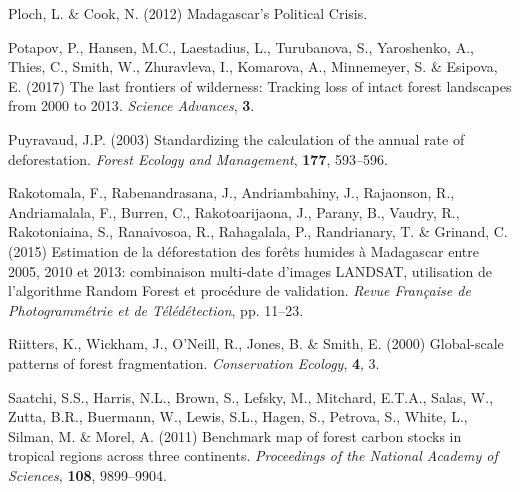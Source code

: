 \documentclass[a4paper, 12pt, leqno]{article} %
\begin{document}
\begin{thebibliography}{55}
Ploch, L. \& Cook, N. (2012) {Madagascar's Political Crisis}.

Potapov, P., Hansen, M.C., Laestadius, L., Turubanova, S., Yaroshenko, A.,
  Thies, C., Smith, W., Zhuravleva, I., Komarova, A., Minnemeyer, S. \&
  Esipova, E. (2017) {The last frontiers of wilderness: Tracking loss of intact
  forest landscapes from 2000 to 2013}.
\newblock \emph{Science Advances}, \textbf{3}.

Puyravaud, J.P. (2003) Standardizing the calculation of the annual rate of
  deforestation.
\newblock \emph{Forest Ecology and Management}, \textbf{177}, 593--596.

Rakotomala, F., Rabenandrasana, J., Andriambahiny, J., Rajaonson, R.,
  Andriamalala, F., Burren, C., Rakotoarijaona, J., Parany, B., Vaudry, R.,
  Rakotoniaina, S., Ranaivosoa, R., Rahagalala, P., Randrianary, T. \& Grinand,
  C. (2015) {Estimation de la d{\'e}forestation des for{\^e}ts humides {\`a}
  Madagascar entre 2005, 2010 et 2013: combinaison multi-date d'images LANDSAT,
  utilisation de l'algorithme Random Forest et proc{\'e}dure de validation}.
\newblock \emph{Revue Fran{\c{c}}aise de Photogramm{\'e}trie et de
  T{\'e}l{\'e}d{\'e}tection}, pp. 11--23.

Riitters, K., Wickham, J., O'Neill, R., Jones, B. \& Smith, E. (2000)
  Global-scale patterns of forest fragmentation.
\newblock \emph{Conservation Ecology}, \textbf{4}, 3.

Saatchi, S.S., Harris, N.L., Brown, S., Lefsky, M., Mitchard, E.T.A., Salas,
  W., Zutta, B.R., Buermann, W., Lewis, S.L., Hagen, S., Petrova, S., White,
  L., Silman, M. \& Morel, A. (2011) Benchmark map of forest carbon stocks in
  tropical regions across three continents.
\newblock \emph{Proceedings of the National Academy of Sciences}, \textbf{108},
  9899--9904.


\end{thebibliography}
\end{document}
